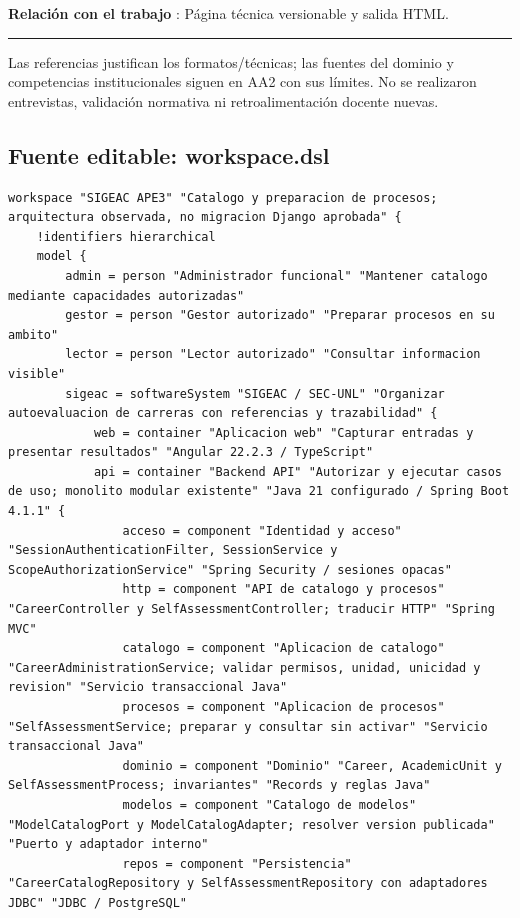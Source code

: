 \documentclass[11pt,a4paper]{article}
\begin{document}
\textbf{Relación con el trabajo }: Página técnica versionable y salida
HTML.

\medskip\hrule\medskip

Las referencias justifican los formatos/técnicas; las fuentes del
dominio y competencias institucionales siguen en AA2 con sus límites. No
se realizaron entrevistas, validación normativa ni retroalimentación
docente nuevas.

\subsection{Fuente editable: workspace.dsl}
\begin{Verbatim}[breaklines=true,breakanywhere=true,fontsize=\footnotesize]
workspace "SIGEAC APE3" "Catalogo y preparacion de procesos; arquitectura observada, no migracion Django aprobada" {
    !identifiers hierarchical
    model {
        admin = person "Administrador funcional" "Mantener catalogo mediante capacidades autorizadas"
        gestor = person "Gestor autorizado" "Preparar procesos en su ambito"
        lector = person "Lector autorizado" "Consultar informacion visible"
        sigeac = softwareSystem "SIGEAC / SEC-UNL" "Organizar autoevaluacion de carreras con referencias y trazabilidad" {
            web = container "Aplicacion web" "Capturar entradas y presentar resultados" "Angular 22.2.3 / TypeScript"
            api = container "Backend API" "Autorizar y ejecutar casos de uso; monolito modular existente" "Java 21 configurado / Spring Boot 4.1.1" {
                acceso = component "Identidad y acceso" "SessionAuthenticationFilter, SessionService y ScopeAuthorizationService" "Spring Security / sesiones opacas"
                http = component "API de catalogo y procesos" "CareerController y SelfAssessmentController; traducir HTTP" "Spring MVC"
                catalogo = component "Aplicacion de catalogo" "CareerAdministrationService; validar permisos, unidad, unicidad y revision" "Servicio transaccional Java"
                procesos = component "Aplicacion de procesos" "SelfAssessmentService; preparar y consultar sin activar" "Servicio transaccional Java"
                dominio = component "Dominio" "Career, AcademicUnit y SelfAssessmentProcess; invariantes" "Records y reglas Java"
                modelos = component "Catalogo de modelos" "ModelCatalogPort y ModelCatalogAdapter; resolver version publicada" "Puerto y adaptador interno"
                repos = component "Persistencia" "CareerCatalogRepository y SelfAssessmentRepository con adaptadores JDBC" "JDBC / PostgreSQL"

\end{Verbatim}
\end{document}
